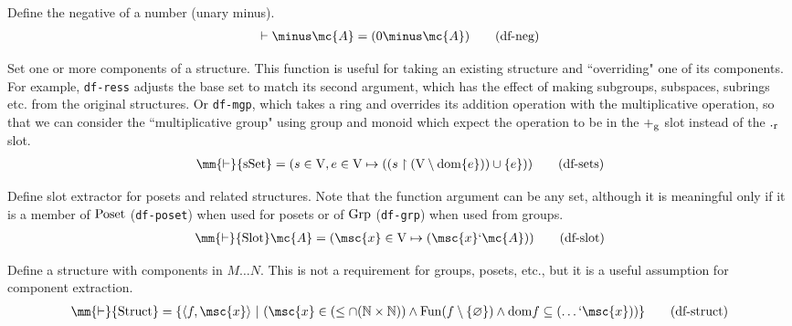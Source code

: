 \begin{metadefinition} {Define the negative of a number} (unary
minus).  
\begin{align}
\vdash \minus\mc{A} = ( 0 \minus \mc{A} )\label{eq:df-neg}\tag{df-neg}
\end{align}
\end{metadefinition}


\begin{metadefinition} {Set one or more components of a
structure.}  This function is useful for
       taking an existing structure and ``overriding" one of its components.
       For example, {\tt df-ress} adjusts the base set to match its second
       argument, which has the effect of making subgroups, subspaces, subrings
       etc. from the original structures.  Or {\tt df-mgp}, which takes a ring
and
       overrides its addition operation with the multiplicative operation, so
       that we can consider the ``multiplicative group" using group and monoid
       which expect the operation to be in the $+_{\rm g}$ slot
instead of
       the $._{\rm r}$ slot.  %
\begin{align}
\mm{\vdash} {\rm sSet} = ( s \in {\rm V} , e \in {\rm V} \mapsto ( ( s
    \restriction ( {\rm V} \setminus {\rm dom} \{ e \} ) ) \cup \{ e \} )
    )\label{eq:df-sets}\tag{df-sets}
\end{align}
\end{metadefinition}


\begin{metadefinition} {Define slot extractor for posets} and
related structures.  Note that the
       function argument can be any set, although it is meaningful only if it
       is a member of ${\rm Poset}$ ({\tt df-poset}) when used for posets or
of
       ${\rm Grp}$ ({\tt df-grp}) when used from groups.  
\begin{align}
\mm{\vdash} {\rm Slot} \mc{A} = ( \msc{x} \in {\rm V} \mapsto ( \msc{x} `
    \mc{A} ) )\label{eq:df-slot}\tag{df-slot}
\end{align}
\end{metadefinition}


\begin{metadefinition} {Define a structure with components in
$M \ldots N$.}  This is not a
       requirement for groups, posets, etc., but it is a useful assumption for
       component extraction.
\begin{align}
\mm{\vdash} {\rm Struct} = \{ \langle f , \msc{x} \rangle ~\vert~ ( \msc{x} \in
    ( \le \cap ( \mathbb{N} \times \mathbb{N} ) ) \wedge {\rm Fun} ( f
    \setminus \{ \varnothing \} ) \wedge {\rm dom} f \subseteq ( \ldots `
    \msc{x} ) ) \}\label{eq:df-struct}\tag{df-struct}
\end{align}
\end{metadefinition}


